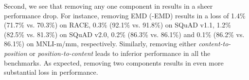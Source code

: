 Second, we see that removing any one component in {\ModelName} results in a sheer performance drop. 
For instance, removing EMD (-EMD) results in a loss of 1.4\% (71.7\% vs. 70.3\%) on RACE, 0.3\% (92.1\% vs. 91.8\%) on SQuAD v1.1, 1.2\% (82.5\% vs. 81.3\%) on SQuAD v2.0, 0.2\% (86.3\% vs. 86.1\%) and 0.1\% (86.2\% vs. 86.1\%) on MNLI-m/mm, respectively. 
Similarly, removing either \textit{content-to-position} or  \textit{position-to-content} leads to inferior performance in all the benchmarks.
As expected, removing two components results in even more substantial loss in performance. 




